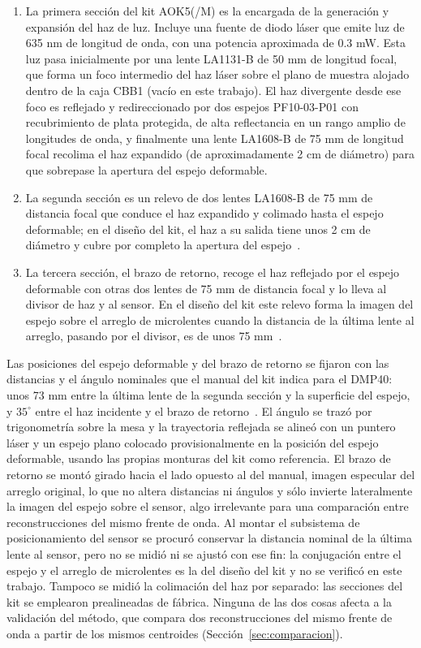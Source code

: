 \documentclass[letterpaper,12pt,oneside]{book}
\begin{document}
\begin{enumerate}
	\item La primera sección del kit AOK5(/M) es la encargada de la generación y expansión del haz de luz. Incluye una fuente de diodo láser que emite luz de 635 nm de longitud de onda, con una potencia aproximada de 0.3 mW. Esta luz pasa inicialmente por una lente LA1131-B de 50 mm de longitud focal, que forma un foco intermedio del haz láser sobre el plano de muestra alojado dentro de la caja CBB1 (vacío en este trabajo). El haz divergente desde ese foco es reflejado y redireccionado por dos espejos PF10-03-P01 con recubrimiento de plata protegida, de alta reflectancia en un rango amplio de longitudes de onda, y finalmente una lente LA1608-B de 75 mm de longitud focal recolima el haz expandido (de aproximadamente 2 cm de diámetro) para que sobrepase la apertura del espejo deformable.
	
	\item La segunda sección es un relevo de dos lentes LA1608-B de 75 mm de distancia focal que conduce el haz expandido y colimado hasta el espejo deformable; en el diseño del kit, el haz a su salida tiene unos 2 cm de diámetro y cubre por completo la apertura del espejo~\cite{ThorlabsAOKManual}.
	
	\item La tercera sección, el brazo de retorno, recoge el haz reflejado por el espejo deformable con otras dos lentes de 75 mm de distancia focal y lo lleva al divisor de haz y al sensor. En el diseño del kit este relevo forma la imagen del espejo sobre el arreglo de microlentes cuando la distancia de la última lente al arreglo, pasando por el divisor, es de unos 75 mm~\cite{ThorlabsAOKManual}.
\end{enumerate}

Las posiciones del espejo deformable y del brazo de retorno se fijaron con las distancias
y el ángulo nominales que el manual del kit indica para el DMP40: unos 73 mm entre la
última lente de la segunda sección y la superficie del espejo, y $35^\circ$ entre el haz
incidente y el brazo de retorno~\cite{ThorlabsAOKManual}. El ángulo se trazó por
trigonometría sobre la mesa y la trayectoria reflejada se alineó con un puntero láser y un
espejo plano colocado provisionalmente en la posición del espejo deformable, usando las
propias monturas del kit como referencia. El brazo de retorno se montó girado hacia el
lado opuesto al del manual, imagen especular del arreglo original, lo que no altera
distancias ni ángulos y sólo invierte lateralmente la imagen del espejo sobre el sensor,
algo irrelevante para una comparación entre reconstrucciones del mismo frente de onda. Al
montar el subsistema de posicionamiento del sensor se procuró conservar la distancia
nominal de la última lente al sensor, pero no se midió ni se ajustó con ese fin: la
conjugación entre el espejo y el arreglo de microlentes es la del diseño del kit y no se
verificó en este trabajo. Tampoco se midió la colimación del haz por separado: las
secciones del kit se emplearon prealineadas de fábrica. Ninguna de las dos cosas afecta a
la validación del método, que compara dos reconstrucciones del mismo frente de onda a
partir de los mismos centroides (Sección~\ref{sec:comparacion}).
\end{document}

